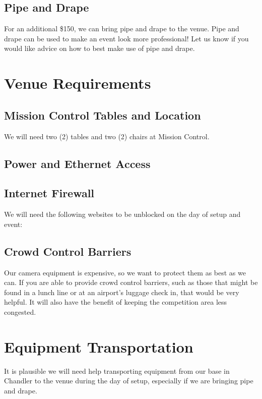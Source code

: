 \documentclass[12pt]{article}
\begin{document}
\subsection{Pipe and Drape}
For an additional \$150, we can bring pipe and drape to the venue.
Pipe and drape can be used to make an event look more professional!
Let us know if you would like advice on how to best make use of pipe and drape.

\section{Venue Requirements}
\subsection{Mission Control Tables and Location}
We will need two (2) tables and two (2) chairs at Mission Control.
\subsection{Power and Ethernet Access}
\subsection{Internet Firewall}
We will need the following websites to be unblocked on the day of setup and event:

\subsection{Crowd Control Barriers}
Our camera equipment is expensive, so we want to protect them as best as we can.
If you are able to provide crowd control barriers, such as those that might be found in a lunch line or at an airport's luggage check in, that would be very helpful.
It will also have the benefit of keeping the competition area less congested.

\section{Equipment Transportation}
It is plausible we will need help transporting equipment from our base in Chandler to the venue during the day of setup, especially if we are bringing pipe and drape.
\end{document}
